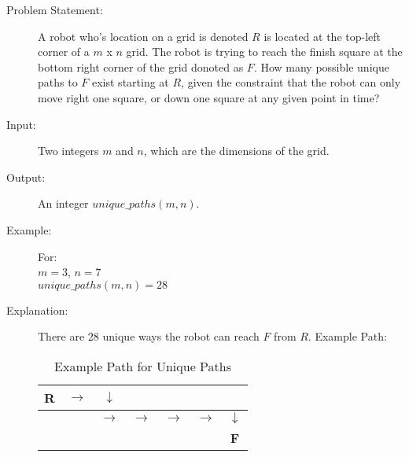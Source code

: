 \begin{description}
    \item[Problem Statement:]
        A robot who's location on a grid is denoted $R$ is located at the top-left corner of a $m$ x $n$ grid.
        The robot is trying to reach the finish square at the bottom right corner of the grid donoted as $F$.
        How many possible unique paths to $F$ exist starting at $R$, given the constraint that the robot can only move right one square, or down one square at any given point in time?
        
    \item[Input:]
        Two integers $m$ and $n$, which are the dimensions of the grid.
        
    \item[Output:] 
        An integer $unique\_paths(m,n)$.
        
    \item[Example:] For:\\
        $m = 3$, $n = 7$\\
        $unique\_paths(m,n) = 28$
        
    \item[Explanation:]
        There are 28 unique ways the robot can reach $F$ from $R$.
        Example Path:

        \begin{table}[htbp]
            \centering
            \begin{tabular}{|c|c|c|c|c|c|c|}
                \hline
                \textbf{R} & $\rightarrow$ & $\downarrow$ &  &  &  &  \\
                \hline
                 &  & $\rightarrow$ & $\rightarrow$ & $\rightarrow$ & $\rightarrow$ & $\downarrow$ \\
                \hline
                 &  &  &  &  &  & \textbf{F} \\
                \hline
            \end{tabular}
            \caption{Example Path for Unique Paths}
        \end{table}

        
\end{description}

